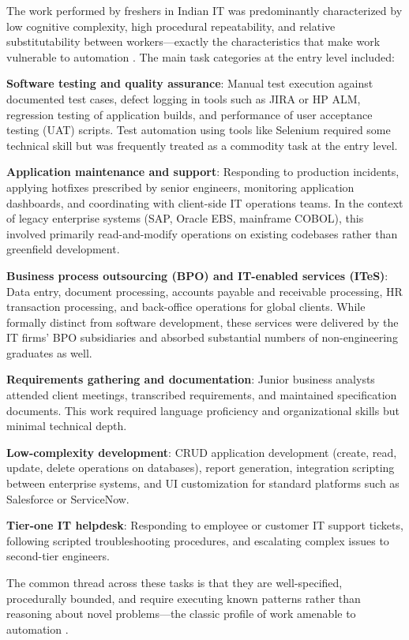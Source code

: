 \documentclass[conference]{IEEEtran}
\begin{document}
The work performed by freshers in Indian IT was predominantly characterized by low cognitive complexity, high procedural repeatability, and relative substitutability between workers---exactly the characteristics that make work vulnerable to automation \cite{autor2003skill}. The main task categories at the entry level included:

\textbf{Software testing and quality assurance}: Manual test execution against documented test cases, defect logging in tools such as JIRA or HP ALM, regression testing of application builds, and performance of user acceptance testing (UAT) scripts. Test automation using tools like Selenium required some technical skill but was frequently treated as a commodity task at the entry level.

\textbf{Application maintenance and support}: Responding to production incidents, applying hotfixes prescribed by senior engineers, monitoring application dashboards, and coordinating with client-side IT operations teams. In the context of legacy enterprise systems (SAP, Oracle EBS, mainframe COBOL), this involved primarily read-and-modify operations on existing codebases rather than greenfield development.

\textbf{Business process outsourcing (BPO) and IT-enabled services (ITeS)}: Data entry, document processing, accounts payable and receivable processing, HR transaction processing, and back-office operations for global clients. While formally distinct from software development, these services were delivered by the IT firms' BPO subsidiaries and absorbed substantial numbers of non-engineering graduates as well.

\textbf{Requirements gathering and documentation}: Junior business analysts attended client meetings, transcribed requirements, and maintained specification documents. This work required language proficiency and organizational skills but minimal technical depth.

\textbf{Low-complexity development}: CRUD application development (create, read, update, delete operations on databases), report generation, integration scripting between enterprise systems, and UI customization for standard platforms such as Salesforce or ServiceNow.

\textbf{Tier-one IT helpdesk}: Responding to employee or customer IT support tickets, following scripted troubleshooting procedures, and escalating complex issues to second-tier engineers.

The common thread across these tasks is that they are well-specified, procedurally bounded, and require executing known patterns rather than reasoning about novel problems---the classic profile of work amenable to automation \cite{levy2004new}.
\end{document}
